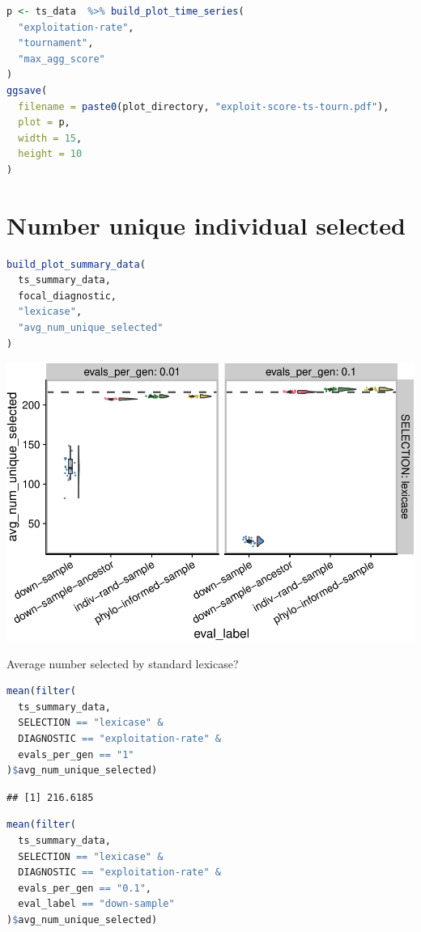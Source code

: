 \documentclass[
]{book}
\begin{document}
\begin{lstlisting}[language=R]
p <- ts_data  %>% build_plot_time_series(
  "exploitation-rate",
  "tournament",
  "max_agg_score"
)
ggsave(
  filename = paste0(plot_directory, "exploit-score-ts-tourn.pdf"),
  plot = p,
  width = 15,
  height = 10
)
\end{lstlisting}

\hypertarget{number-unique-individual-selected}{%
\section{Number unique individual selected}\label{number-unique-individual-selected}}

\begin{lstlisting}[language=R]
build_plot_summary_data(
  ts_summary_data,
  focal_diagnostic,
  "lexicase",
  "avg_num_unique_selected"
)
\end{lstlisting}

\includegraphics{phylogeny-informed-subsampling-supplemental_files/figure-latex/unnamed-chunk-17-1.pdf}

Average number selected by standard lexicase?

\begin{lstlisting}[language=R]
mean(filter(
  ts_summary_data,
  SELECTION == "lexicase" &
  DIAGNOSTIC == "exploitation-rate" &
  evals_per_gen == "1"
)$avg_num_unique_selected)
\end{lstlisting}

\begin{lstlisting}
## [1] 216.6185
\end{lstlisting}

\begin{lstlisting}[language=R]
mean(filter(
  ts_summary_data,
  SELECTION == "lexicase" &
  DIAGNOSTIC == "exploitation-rate" &
  evals_per_gen == "0.1",
  eval_label == "down-sample"
)$avg_num_unique_selected)
\end{lstlisting}
\end{document}
